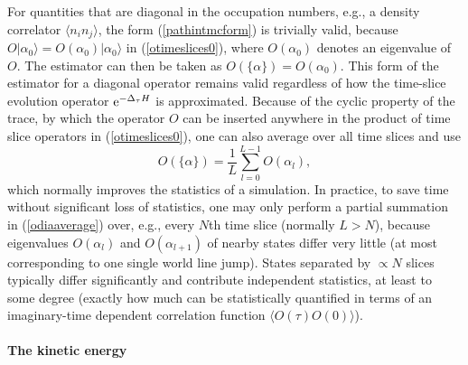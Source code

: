 \documentclass[draft,numberedheadings]{aipproc}
\begin{document}
For quantities that are diagonal in the occupation numbers, e.g., a density correlator $\langle n_in_j\rangle$, the form (\ref{pathintmcform}) is trivially valid, 
because $O| \alpha_0\rangle = O(\alpha_0)|\alpha_0\rangle$ in (\ref{otimeslices0}), where $O(\alpha_0)$ denotes an eigenvalue of $O$. The estimator can then be taken 
as $O(\{\alpha\})=O(\alpha_0)$. This form of the estimator for a diagonal operator remains valid regardless of how the time-slice evolution operator 
${\rm e}^{-\Delta_\tau H}$ is approximated. Because of the cyclic property of the trace, by which the operator $O$ can be inserted anywhere in the product of time 
slice operators in (\ref{otimeslices0}), one can also average over all time slices and use
\begin{equation}
O(\{\alpha\})=\frac{1}{L}\sum_{l=0}^{L-1}O(\alpha_l),
\label{odiaaverage}
\end{equation}
which normally improves the statistics of a simulation. In practice, to save time without significant loss of statistics, one may only perform a partial summation 
in (\ref{odiaaverage}) over, e.g., every $N$th time slice (normally $L > N$), because eigenvalues $O(\alpha_l)$ and $O(\alpha_{l+1})$ of nearby states differ 
very little (at most corresponding to one single world line jump). States separated by $\propto N$ slices typically differ significantly and contribute independent 
statistics, at least to some degree (exactly how much can be statistically quantified in terms of an imaginary-time dependent correlation function 
$\langle O(\tau)O(0)\rangle$).

\paragraph{The kinetic energy}
\end{document}
